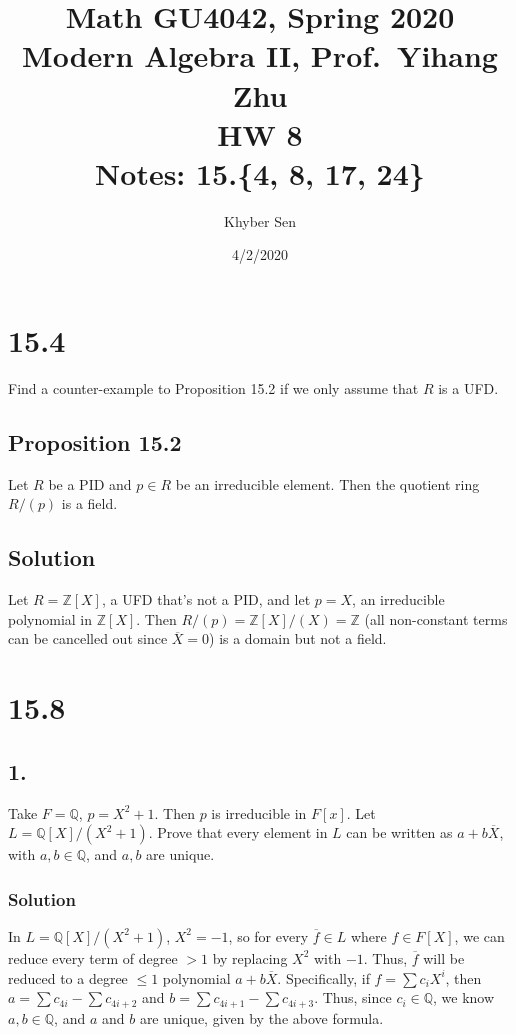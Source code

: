 \documentclass[fleqn]{article}
\title{
Math GU4042, Spring 2020 \\
Modern Algebra II, Prof.\ Yihang Zhu \\
HW 8 \\
Notes: 15.\{4, 8, 17, 24\} \\
}
\author{Khyber Sen}
\date{4/2/2020}
\begin{document}
    
    \maketitle
    
    \section{15.4}
    Find a counter-example to Proposition 15.2 if we only assume that $R$ is a UFD.
        
        \subsection{Proposition 15.2}
        Let $R$ be a PID and $p \in R$ be an irreducible element.  Then the quotient ring $R/(p)$ is a field.
        
        \subsection{Solution}
        Let $R = \mathbb{Z}[X]$, a UFD that's not a PID, and let $p = X$, an irreducible polynomial in $\mathbb{Z}[X]$.  Then $R/(p) = \mathbb{Z}[X]/(X) = \mathbb{Z}$ (all non-constant terms can be cancelled out since $\overline{X} = 0$) is a domain but not a field.
    
    \section{15.8}
        
        \subsection{1.}
        Take $F = \mathbb{Q}$, $p = X^2 + 1$.  Then $p$ is irreducible in $F[x]$.  Let $L = \mathbb{Q}[X]/(X^2 + 1)$.  Prove that every element in $L$ can be written as $a + b\overline{X}$, with $a, b \in \mathbb{Q}$, and $a, b$ are unique.
            
            \subsubsection{Solution}
            In $L = \mathbb{Q}[X]/(X^2 + 1)$, $X^2 = -1$, so for every $\overline{f} \in L$ where $f \in F[X]$, we can reduce every term of degree $> 1$ by replacing $X^2$ with $-1$.  Thus, $\overline{f}$ will be reduced to a degree $\leq 1$ polynomial $a + b\overline{X}$.  Specifically, if $f = \sum c_i X^i$, then $a = \sum c_{4i} - \sum c_{4i + 2}$ and $b = \sum c_{4i + 1} - \sum c_{4i + 3}$.  Thus, since $c_i \in \mathbb{Q}$, we know $a, b \in \mathbb{Q}$, and $a$ and $b$ are unique, given by the above formula.
        
\end{document}
